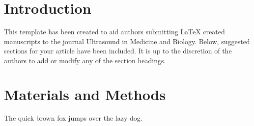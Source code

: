 \documentclass[review,authoryear,12pt]{elsarticle}
\begin{document}
\pagebreak

\linenumbers








\section*{Introduction}
\label{intro}
This template has been created to aid authors submitting LaTeX created manuscripts to the journal Ultrasound in Medicine and Biology.  Below, suggested sections for your article have been included.  It is up to the discretion of the authors to add or modify any of the section headings.  

\section*{Materials and Methods}
\label{MaM}
The quick brown fox jumps over the lazy dog.
      
\end{document}

